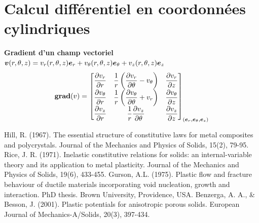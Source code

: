 \documentclass[french,12pt]{exam}
\begin{document}
\section*{Calcul différentiel en coordonnées cylindriques}
\textbf{Gradient d'un champ vectoriel} $\boldsymbol{v}(r,\theta,z)=v_r(r,\theta,z)\boldsymbol{e}_r+v_\theta(r,\theta,z)\boldsymbol{e}_\theta+v_z(r,\theta,z)\boldsymbol{e}_z$
$$ \boldsymbol{\mathrm{grad}}{\left(v\right)} = \begin{bmatrix}
\dfrac{\partial v_r}{\partial r} & \dfrac{1}{r}\left(\dfrac{\partial v_r}{\partial \theta} - v_\theta\right) & \dfrac{\partial v_r}{\partial z} \\
\dfrac{\partial v_\theta}{\partial r} & \dfrac{1}{r}\left(\dfrac{\partial v_\theta}{\partial \theta} + v_r\right) & \dfrac{\partial v_\theta}{\partial z} \\
\dfrac{\partial v_z}{\partial r} & \dfrac{1}{r}\dfrac{\partial v_z}{\partial \theta} & \dfrac{\partial v_z}{\partial z} \\
\end{bmatrix}_{(\boldsymbol{e}_r,\boldsymbol{e}_\theta,\boldsymbol{e}_z)}$$

\begin{thebibliography}{9}
Hill, R. (1967). The essential structure of constitutive laws for metal composites and polycrystals. Journal of the Mechanics and Physics of Solids, 15(2), 79-95.
Rice, J. R. (1971). Inelastic constitutive relations for solids: an internal-variable theory and its application to metal plasticity. Journal of the Mechanics and Physics of Solids, 19(6), 433-455.
Gurson, A.L. (1975). Plastic flow and fracture behaviour of ductile materials incorporating void nucleation, growth and interaction. PhD thesis. Brown University, Providence, USA.
Benzerga, A. A.,   \& Besson, J. (2001). Plastic potentials for anisotropic porous solids. European Journal of Mechanics-A/Solids, 20(3), 397-434.


\end{thebibliography}
\end{document}
